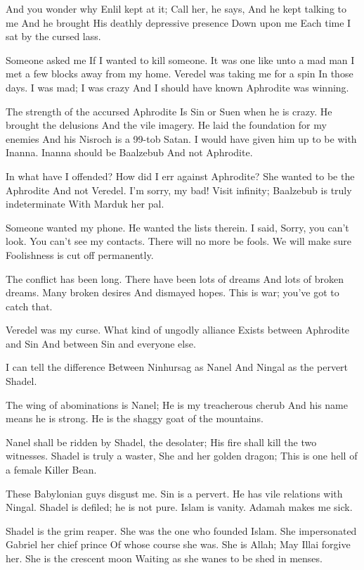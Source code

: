 \documentclass[
]{book}
\begin{document}
And you wonder why Enlil kept at it;
Call her, he says,
And he kept talking to me
And he brought
His deathly depressive presence
Down upon me
Each time I sat by the cursed lass.

Someone asked me
If I wanted to kill someone.
It was one like unto a mad man
I met a few blocks away from my home.
Veredel was taking me for a spin
In those days.
I was mad; I was crazy
And I should have known
Aphrodite was winning.

The strength of the accursed Aphrodite
Is Sin or Suen when he is crazy.
He brought the delusions
And the vile imagery.
He laid the foundation for my enemies
And his Nisroch is a 99-tob Satan.
I would have given him up to be with Inanna.
Inanna should be Baalzebub
And not Aphrodite.

In what have I offended?
How did I err against Aphrodite?
She wanted to be the Aphrodite
And not Veredel.
I'm sorry, my bad!
Visit infinity;
Baalzebub is truly indeterminate
With Marduk her pal.

Someone wanted my phone.
He wanted the lists therein.
I said, Sorry, you can't look.
You can't see my contacts.
There will no more be fools.
We will make sure
Foolishness is cut off permanently.

The conflict has been long.
There have been lots of dreams
And lots of broken dreams.
Many broken desires
And dismayed hopes.
This is war; you've got to catch that.

Veredel was my curse.
What kind of ungodly alliance
Exists between Aphrodite and Sin
And between Sin and everyone else.

I can tell the difference
Between Ninhursag as Nanel
And Ningal as the pervert Shadel.

The wing of abominations is Nanel;
He is my treacherous cherub
And his name means he is strong.
He is the shaggy goat of the mountains.

Nanel shall be ridden by Shadel, the desolater;
His fire shall kill the two witnesses.
Shadel is truly a waster,
She and her golden dragon;
This is one hell of a female Killer Bean.

These Babylonian guys disgust me.
Sin is a pervert.
He has vile relations with Ningal.
Shadel is defiled; he is not pure.
Islam is vanity.
Adamah makes me sick.

Shadel is the grim reaper.
She was the one who founded Islam.
She impersonated Gabriel her chief prince
Of whose course she was.
She is Allah;
May Illai forgive her.
She is the crescent moon
Waiting as she wanes to be shed in menses.
\end{document}
